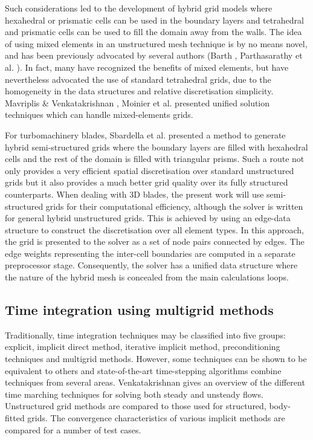  Such considerations led to the development of hybrid grid models
 where hexahedral or prismatic cells can be used in the boundary layers
 and tetrahedral and prismatic cells can be used to fill the domain away
 from the walls.
 The idea of using mixed elements in an unstructured mesh technique is by no means novel,
 and has been previously advocated by several authors (Barth ,
 Parthasarathy et al. ).
 In fact, many have recognized the benefits
 of mixed elements, but have nevertheless advocated the use of standard tetrahedral 
 grids, due to the homogeneity in the data structures and relative
 discretisation simplicity.
 Mavriplis \& Venkatakrishnan \citeyear{Mavriplis:3}, 
 Moinier et al. \citeyear{Giles:9} presented unified solution techniques
 which can handle mixed-elements grids.

 For turbomachinery blades, Sbardella et al. \citeyear{Luca:3,Luca:9}
 presented a method to generate hybrid semi-structured grids  
 where the boundary
 layers are filled with hexahedral cells and the rest of the domain is filled
 with triangular prisms. Such a route not only provides a very efficient
 spatial discretisation over  standard
 unstructured grids but it also provides a much better grid quality over its  
 fully structured counterparts.
 When dealing with 3D blades, the present work will use semi-structured
 grids for their computational efficiency,
 although the solver is written for general hybrid unstructured grids.
 This is achieved
 by using an edge-data structure to construct the discretisation over all
 element types.
 In this approach, the grid is presented to the solver
 as a set of node pairs connected by edges. The edge weights representing
 the inter-cell boundaries are computed in a separate preprocessor stage.
 Consequently, the solver has a unified data structure where the  
 nature of the hybrid mesh is concealed from the main calculations loops.
%
%
\subsection{Time integration using multigrid methods}
%
 Traditionally, time integration techniques may be classified into
 five groups: explicit, implicit direct method, iterative implicit
 method, preconditioning techniques and multigrid methods.
 However, some techniques can be shown to be equivalent to others 
 and state-of-the-art time-stepping algorithms combine techniques
 from several areas.
 Venkatakrishnan \citeyear{Vankata:3} gives an overview of the
 different time marching techniques for solving both steady
 and unsteady flows.
 Unstructured grid methods are compared to those used for structured,
 body-fitted grids. The convergence characteristics of
 various implicit methods are compared for a number of test cases.
 
